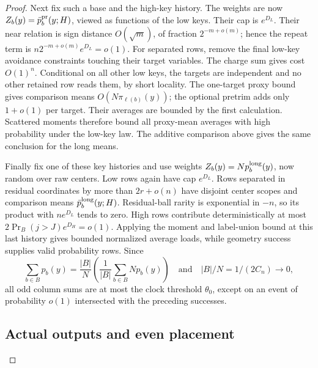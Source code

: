 \begin{proof}
Next fix such a base and the high-key history. The weights are now
\(Z_b(y)=\bar p_b^{\rm pr}(y;H)\), viewed as functions of the low
keys. Their cap is \(e^{D_L}\). Their near relation is sign distance
\(O(\sqrt m)\), of fraction \(2^{-m+o(m)}\); hence the repeat term is
\(n2^{-m+o(m)}e^{D_L}=o(1)\). For separated rows, remove the final
low-key avoidance constraints touching their target variables. The
charge sum gives cost \(O(1)^n\). Conditional on all other low keys,
the targets are independent and no other retained row reads them, by
short locality. The one-target proxy bound gives comparison means
\(O(N\pi_{\ell(b)}(y))\); the optional pretrim adds only \(1+o(1)\)
per target. Their averages are bounded by the first calculation.
Scattered moments therefore bound all proxy-mean averages with high
probability under the low-key law. The additive comparison above gives
the same conclusion for the long means.

Finally fix one of these key histories and use weights
\(Z_b(y)=Np_b^{\rm long}(y)\), now random over raw centers. Low rows
again have cap \(e^{D_L}\). Rows separated in residual coordinates by
more than \(2r+o(n)\) have disjoint center scopes and comparison means
\(\bar p_b^{\rm long}(y;H)\). Residual-ball rarity is exponential in
\(-n\), so its product with \(ne^{D_L}\) tends to zero. High rows
contribute deterministically at most
\(2\Pr_B(j>J)e^{D_H}=o(1)\). Applying the moment and label-union
bound at this last history gives bounded normalized average loads,
while geometry success supplies valid probability rows. Since
\[
 \sum_{b\in B}p_b(y)=\frac{|B|}{N}
             \left(\frac1{|B|}\sum_{b\in B}Np_b(y)\right)
 \quad\text{and}\quad |B|/N=1/(2C_n)\longrightarrow0,
\]
all odd column sums are at most the clock threshold \(\theta_0\),
except on an event of probability \(o(1)\) intersected with the preceding
successes.

\subsection{Actual outputs and even placement}
\label{sec:actual-outputs-and-even-placement}


\end{proof}
